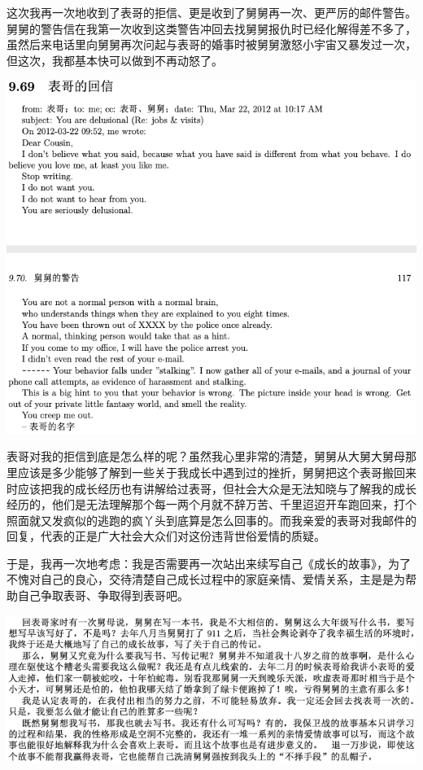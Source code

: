 \documentclass[9pt, b5paper]{article}
\begin{document}
这次我再一次地收到了表哥的拒信、更是收到了舅舅再一次、更严厉的邮件警告。舅舅的警告信在我第一次收到这类警告冲回去找舅舅报仇时已经化解得差不多了，虽然后来电话里向舅舅再次问起与表哥的婚事时被舅舅激怒小宇宙又暴发过一次，但这次，我都基本快可以做到不再动怒了。 

\begin{center}
\includegraphics[width=.9\linewidth]{./pic/p1p117.png}
\end{center}

表哥对我的拒信到底是怎么样的呢？虽然我心里非常的清楚，舅舅从大舅大舅母那里应该是多少能够了解到一些关于我成长中遇到过的挫折，舅舅把这个表哥搬回来时应该把我的成长经历也有讲解给过表哥，但社会大众是无法知晓与了解我的成长经历的，他们是无法理解那个每一两个月就不辞万苦、千里迢迢开车跑回来，打个照面就又发疯似的逃跑的疯丫头到底算是怎么回事的。而我亲爱的表哥对我邮件的回复，代表的正是广大社会大众们对这份违背世俗爱情的质疑。

于是，我再一次地考虑：我是否需要再一次站出来续写自己《成长的故事》，为了不愧对自己的良心，交待清楚自己成长过程中的家庭亲情、爱情关系，主是是为帮助自己争取表哥、争取得到表哥吧。

\begin{center}
\includegraphics[width=.9\linewidth]{./pic/p1p128.png}
\end{center}
\end{document}
